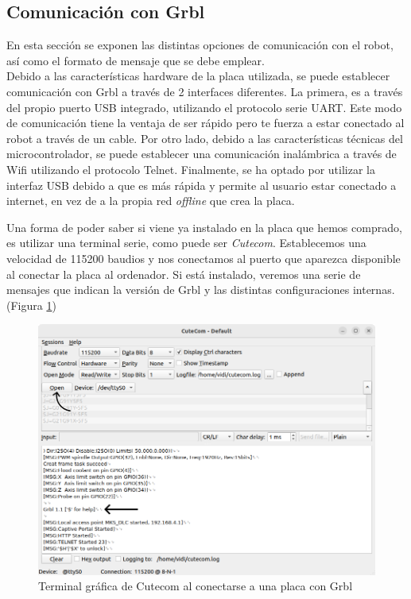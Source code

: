 \subsection{Comunicación con Grbl}
\noindent En esta sección se exponen las distintas opciones de comunicación con el robot, así como el formato de mensaje que se debe emplear.
\\ 
\indent Debido a las características hardware de la placa utilizada, se puede establecer comunicación con Grbl a través de 2 interfaces diferentes. 
La primera, es a través del propio puerto USB integrado, utilizando el protocolo serie UART. Este modo de comunicación tiene la ventaja de 
ser rápido pero te fuerza a estar conectado al robot a través de un cable. Por otro lado, debido a las características técnicas del 
microcontrolador, se puede establecer una comunicación inalámbrica a través de Wifi utilizando el protocolo Telnet. Finalmente, se ha optado 
por utilizar la interfaz USB debido a que es más rápida y permite al usuario estar conectado a internet, en vez de a la propia red 
\textit{offline} que crea la placa.

\indent Una forma de poder saber si viene ya instalado en la placa que hemos comprado, es utilizar una terminal serie, como 
puede ser \textit{Cutecom}. Establecemos una velocidad de 115200 baudios y nos conectamos al puerto que aparezca disponible 
al conectar la placa al ordenador. Si está instalado, veremos una serie de mensajes que indican la versión de Grbl y las 
distintas configuraciones internas. (Figura \ref{fig:cutecom})
\begin{figure} [ht!]
\begin{center}
    \includegraphics[width=14cm]{figs/cutecom.png}
\end{center}
\caption{Terminal gráfica de Cutecom al conectarse a una placa con Grbl}
\label{fig:cutecom}
\end{figure}

